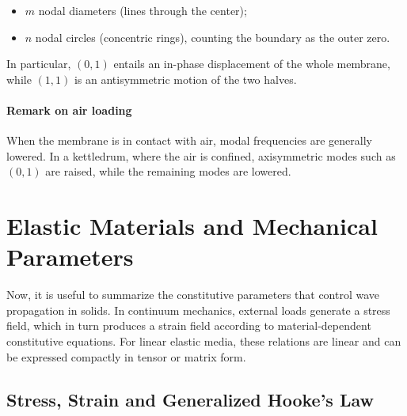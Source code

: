 \begin{itemize}
    \item \( m \) nodal diameters (lines through the center);
    \item \( n \) nodal circles (concentric rings), counting the boundary as the outer zero.
\end{itemize}

In particular, \( (0,1) \) entails an in-phase displacement of the whole membrane, while \( (1,1) \) is an antisymmetric motion of the two halves. 

\paragraph{Remark on air loading} When the membrane is in contact with air, modal frequencies are generally lowered. In a kettledrum, where the air is confined, axisymmetric modes such as \( (0,1) \) are raised, while the remaining modes are lowered. 

\section{Elastic Materials and Mechanical Parameters}

Now, it is useful to summarize the constitutive parameters that control wave propagation in solids. In continuum mechanics, external loads generate a stress field, which in turn produces a strain field according to material-dependent constitutive equations. For linear elastic media, these relations are linear and can be expressed compactly in tensor or matrix form. 

\subsection{Stress, Strain and Generalized Hooke's Law}

